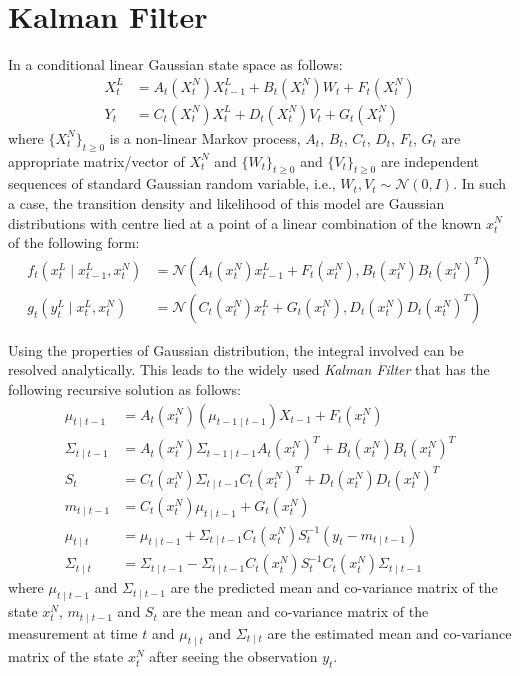 \chapter{Kalman Filter}
\graphicspath{{Appendices/figures/}}
\label{sec:KF}
In a conditional linear Gaussian state space as follows:
\begin{align}
  X^L_t &= A_t(X^N_t)X^L_{t-1} + B_t(X^N_t)W_t + F_t(X^N_t) \\
  Y_t &= C_t(X^N_t)X^L_t + D_t(X^N_t)V_t + G_t(X^N_t)
\end{align}
where $\{X^N_t\}_{t \geq 0}$ is a non-linear Markov process, $A_t$, $B_t$, $C_t$, $D_t$, $F_t$, $G_t$ are appropriate matrix/vector of $X^N_t$ and  $\{W_t\}_{t \geq 0}$ and  $\{V_t\}_{t \geq 0}$ are independent sequences of standard Gaussian random variable, i.e., $W_t, V_t \sim \mathcal{N}(0,I)$. In such a case, the transition density and likelihood of this model are Gaussian distributions with centre lied at a point of a linear combination of the known $x^N_t$ of the following form:
\begin{align}
  f_t(x^L_t \mid x^L_{t-1}, x^N_t) &= \mathcal{N}(A_t(x^N_t) x^L_{t-1} + F_t(x^N_t), B_t(x^N_t)B_t(x^N_t)^T) \nonumber \\
  g_t(y^L_t \mid x^L_t, x^N_t)    &= \mathcal{N}(C_t(x^N_t) x^L_t + G_t(x^N_t), D_t(x^N_t)D_t(x^N_t)^T)
\end{align}

Using the properties of Gaussian distribution, the integral involved can be resolved analytically. This leads to the widely used \emph{Kalman Filter} \cite{KRE60} that has the following recursive solution as follows:
\begin{align}
  \mu_{t \mid t -1} &= A_{t}(x^N_t)(\mu_{t-1 \mid t-1})X_{t-1} + F_t(x^N_t) \\
  \Sigma_{t \mid t -1} &= A_{t}(x^N_t)\Sigma_{t -1 \mid t -1}A_{t}(x^N_t)^T +  B_t(x^N_t)B_t(x^N_t)^T \\
  S_t &=  C_{t}(x^N_t)\Sigma_{t \mid t -1}C_{t}(x^N_t)^T +  D_t(x^N_t)D_t(x^N_t)^T \\
  m_{t \mid t-1} &=  C_{t}(x^N_t)  \mu_{t \mid t-1} + G_t(x^N_t) \\
  \mu_{t \mid t} &=   \mu_{t \mid t-1} +   \Sigma_{t \mid t -1} C_{t}(x^N_t)S_t^{-1}(y_t - m_{t \mid t-1}) \\
  \Sigma_{t \mid t} &=  \Sigma_{t \mid t -1} -\Sigma_{t \mid t -1} C_{t}(x^N_t)S_t^{-1} C_{t}(x^N_t)\Sigma_{t \mid t -1}
\end{align}
where  $\mu_{t \mid t -1}$ and $\Sigma_{t \mid t-1}$ are the predicted mean and co-variance matrix of the state $x^N_t$, $m_{t \mid t-1}$ and $S_t$ are the mean and co-variance matrix of the measurement at time $t$ and $\mu_{t \mid t}$ and $\Sigma_{t \mid t}$ are the estimated mean and co-variance matrix of the state $x^N_t$ after seeing the observation $y_t$.


